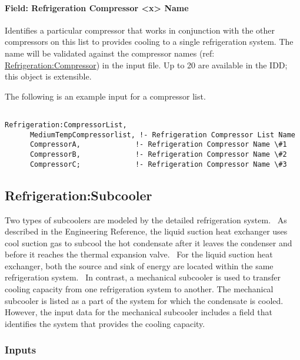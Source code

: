 \paragraph{Field: Refrigeration Compressor \textless{}x\textgreater{} Name}\label{field-refrigeration-compressor-x-name}

Identifies a particular compressor that works in conjunction with the other compressors on this list to provides cooling to a single refrigeration system. The name will be validated against the compressor names (ref: \hyperref[refrigerationcompressor]{Refrigeration:Compressor}) in the input file. Up to 20 are available in the IDD; this object is extensible.

The following is an example input for a compressor list.

\begin{lstlisting}

Refrigeration:CompressorList,
      MediumTempCompressorlist, !- Refrigeration Compressor List Name
      CompressorA,             !- Refrigeration Compressor Name \#1
      CompressorB,             !- Refrigeration Compressor Name \#2
      CompressorC;             !- Refrigeration Compressor Name \#3
\end{lstlisting}

\subsection{Refrigeration:Subcooler}\label{refrigerationsubcooler}

Two types of subcoolers are modeled by the detailed refrigeration system.~ As described in the Engineering Reference, the liquid suction heat exchanger uses cool suction gas to subcool the hot condensate after it leaves the condenser and before it reaches the thermal expansion valve.~ For the liquid suction heat exchanger, both the source and sink of energy are located within the same refrigeration system.~ In contrast, a mechanical subcooler is used to transfer cooling capacity from one refrigeration system to another. The mechanical subcooler is listed as a part of the system for which the condensate is cooled.~ However, the input data for the mechanical subcooler includes a field that identifies the system that provides the cooling capacity.

\subsubsection{Inputs}\label{inputs-7-020}


